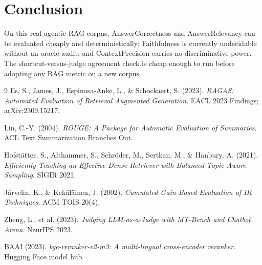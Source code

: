 \documentclass[11pt]{article}
\begin{document}
\section{Conclusion}\label{sec:conclusion}

On this real agentic-RAG corpus, AnswerCorrectness and AnswerRelevancy can be
evaluated cheaply and deterministically; Faithfulness is currently undecidable
without an oracle audit; and ContextPrecision carries no discriminative power.
The shortcut-versus-judge agreement check is cheap enough to run before
adopting any RAG metric on a new corpus.

\begin{thebibliography}{9}
  Es, S., James, J., Espinosa-Anke, L., \& Schockaert, S. (2023).
  \emph{RAGAS: Automated Evaluation of Retrieval Augmented Generation}.
  EACL 2023 Findings; arXiv:2309.15217.

  Lin, C.-Y. (2004).
  \emph{ROUGE: A Package for Automatic Evaluation of Summaries}.
  ACL Text Summarization Branches Out.

  Hofstätter, S., Althammer, S., Schröder, M., Sertkan, M., \& Hanbury, A.
  (2021).
  \emph{Efficiently Teaching an Effective Dense Retriever with Balanced Topic
  Aware Sampling}. SIGIR 2021.

  Järvelin, K., \& Kekäläinen, J. (2002).
  \emph{Cumulated Gain-Based Evaluation of IR Techniques}.
  ACM TOIS 20(4).

  Zheng, L., et al. (2023).
  \emph{Judging LLM-as-a-Judge with MT-Bench and Chatbot Arena}.
  NeurIPS 2023.

  BAAI (2023).
  \emph{bge-reranker-v2-m3: A multi-lingual cross-encoder reranker}.
  Hugging Face model hub.
\end{thebibliography}
\end{document}
